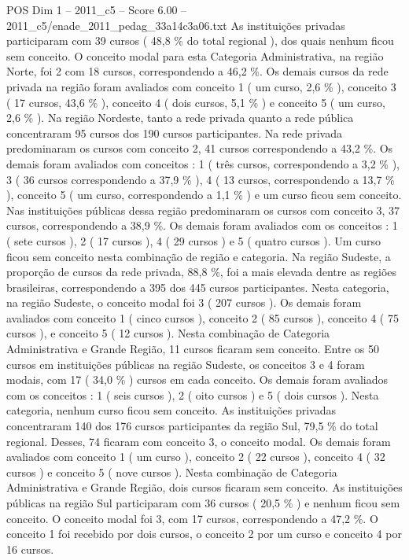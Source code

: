 \begin{textsample}{POS Dim 1 – 2011\_c5 – Score 6.00 – 2011\_c5/enade\_2011\_pedag\_33a14c3a06.txt}
As instituições privadas participaram com 39 cursos ( 48,8 \% do total regional ), dos quais nenhum ficou sem conceito.
O conceito modal para esta Categoria Administrativa, na região Norte, foi 2 com 18 cursos, correspondendo a 46,2 \%.
Os demais cursos da rede privada na região foram avaliados com conceito 1 ( um curso, 2,6 \% ), conceito 3 ( 17 cursos, 43,6 \% ), conceito 4 ( dois cursos, 5,1 \% ) e conceito 5 ( um curso, 2,6 \% ).
Na região Nordeste, tanto a rede privada quanto a rede pública concentraram 95 cursos dos 190 cursos participantes.
Na rede privada predominaram os cursos com conceito 2, 41 cursos correspondendo a 43,2 \%.
Os demais foram avaliados com conceitos : 1 ( três cursos, correspondendo a 3,2 \% ), 3 ( 36 cursos correspondendo a 37,9 \% ), 4 ( 13 cursos, correspondendo a 13,7 \% ), conceito 5 ( um curso, correspondendo a 1,1 \% ) e um curso ficou sem conceito.
Nas instituições públicas dessa região predominaram os cursos com conceito 3, 37 cursos, correspondendo a 38,9 \%.
Os demais foram avaliados com os conceitos : 1 ( sete cursos ), 2 ( 17 cursos ), 4 ( 29 cursos ) e 5 ( quatro cursos ).
Um curso ficou sem conceito nesta combinação de região e categoria.
Na região Sudeste, a proporção de cursos da rede privada, 88,8 \%, foi a mais elevada dentre as regiões brasileiras, correspondendo a 395 dos 445 cursos participantes.
Nesta categoria, na região Sudeste, o conceito modal foi 3 ( 207 cursos ).
Os demais foram avaliados com conceito 1 ( cinco cursos ), conceito 2 ( 85 cursos ), conceito 4 ( 75 cursos ), e conceito 5 ( 12 cursos ).
Nesta combinação de Categoria Administrativa e Grande Região, 11 cursos ficaram sem conceito.
Entre os 50 cursos em instituições públicas na região Sudeste, os conceitos 3 e 4 foram modais, com 17 ( 34,0 \% ) cursos em cada conceito.
Os demais foram avaliados com os conceitos : 1 ( seis cursos ), 2 ( oito cursos ) e 5 ( dois cursos ).
Nesta categoria, nenhum curso ficou sem conceito.
As instituições privadas concentraram 140 dos 176 cursos participantes da região Sul, 79,5 \% do total regional.
Desses, 74 ficaram com conceito 3, o conceito modal.
Os demais foram avaliados com conceito 1 ( um curso ), conceito 2 ( 22 cursos ), conceito 4 ( 32 cursos ) e conceito 5 ( nove cursos ).
Nesta combinação de Categoria Administrativa e Grande Região, dois cursos ficaram sem conceito.
As instituições públicas na região Sul participaram com 36 cursos ( 20,5 \% ) e nenhum ficou sem conceito.
O conceito modal foi 3, com 17 cursos, correspondendo a 47,2 \%.
O conceito 1 foi recebido por dois cursos, o conceito 2 por um curso e conceito 4 por 16 cursos.

\end{textsample}
